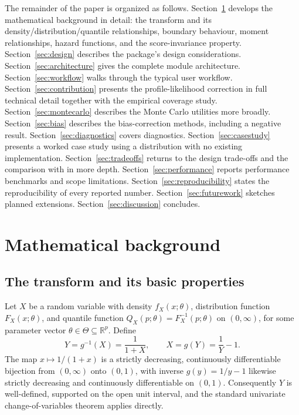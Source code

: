 \documentclass[article]{jss}
\begin{document}
The remainder of the paper is organized as follows. Section~\ref{sec:math} develops the mathematical background in detail: the transform and its density/distribution/quantile relationships, boundary behaviour, moment relationships, hazard functions, and the score-invariance property. Section~\ref{sec:design} describes the package's design considerations. Section~\ref{sec:architecture} gives the complete module architecture. Section~\ref{sec:workflow} walks through the typical user workflow. Section~\ref{sec:contribution} presents the profile-likelihood correction in full technical detail together with the empirical coverage study. Section~\ref{sec:montecarlo} describes the Monte Carlo utilities more broadly. Section~\ref{sec:bias} describes the bias-correction methods, including a negative result. Section~\ref{sec:diagnostics} covers diagnostics. Section~\ref{sec:casestudy} presents a worked case study using a distribution with no existing  implementation. Section~\ref{sec:tradeoffs} returns to the design trade-offs and the comparison with  in more depth. Section~\ref{sec:performance} reports performance benchmarks and scope limitations. Section~\ref{sec:reproducibility} states the reproducibility of every reported number. Section~\ref{sec:futurework} sketches planned extensions. Section~\ref{sec:discussion} concludes.

\section{Mathematical background}
\label{sec:math}

\subsection{The transform and its basic properties}

Let $X$ be a random variable with density $f_X(x;\theta)$, distribution function $F_X(x;\theta)$, and quantile function $Q_X(p;\theta) = F_X^{-1}(p;\theta)$ on $(0,\infty)$, for some parameter vector $\theta \in \Theta \subseteq \mathbb{R}^p$. Define
\begin{equation}
  Y = g^{-1}(X) = \frac{1}{1+X}, \qquad X = g(Y) = \frac{1}{Y} - 1.
  \label{eq:transform}
\end{equation}
The map $x \mapsto 1/(1+x)$ is a strictly decreasing, continuously differentiable bijection from $(0,\infty)$ onto $(0,1)$, with inverse $g(y) = 1/y - 1$ likewise strictly decreasing and continuously differentiable on $(0,1)$. Consequently $Y$ is well-defined, supported on the open unit interval, and the standard univariate change-of-variables theorem \citep{casellaberger2002} applies directly.
\end{document}
